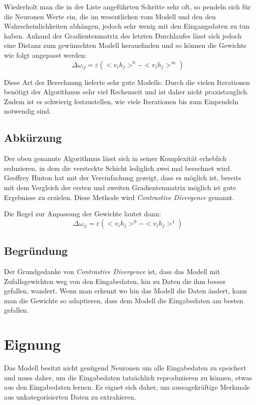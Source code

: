 Wiederholt man die in der Liste angeführten Schritte sehr oft, so pendeln sich für die Neuronen Werte ein, die im wesentlichen vom Modell und den den Wahrscheinlichkeiten abhängen, jedoch sehr wenig mit den Eingangsdaten zu tun haben. Anhand der Gradientenmatrix des letzten Durchlaufes lässt sich jedoch eine Distanz zum gewünschten Modell herausfinden und so können die Gewichte wie folgt angepasst werden:
$$\Delta\omega_{ij} = \varepsilon (<v_ih_j>^0 -  <v_ih_j>^\infty)$$

Diese Art der Berechnung lieferte sehr gute Modelle. Durch die vielen Iterationen benötigt der Algorithmus sehr viel Rechenzeit und ist daher nicht praxistauglich. Zudem ist es schwierig festzustellen, wie viele Iterationen bis zum Einpendeln notwendig sind.

\subsection{Abkürzung}

Der oben genannte Algorithmus lässt sich in seiner Komplexität erheblich reduzieren, in dem die versteckte Schicht lediglich zwei mal berechnet wird. Geoffrey Hinton hat mit der Vereinfachung gezeigt, dass es möglich ist, bereits mit dem Vergleich der ersten und zweiten Gradientenmatrix möglich ist gute Ergebnisse zu erzielen. Diese Methode wird \emph{Contrastive Divergence} genannt.

Die Regel zur Anpassung der Gewichte lautet dann:
$$\Delta\omega_{ij} = \varepsilon (<v_ih_j>^0 -  <v_ih_j>^1)$$

\subsection{Begründung}

Der Grundgedanke von \emph{Contrastive Divergence} ist, dass das Modell mit Zufallsgewichten weg von den Eingabedaten, hin zu Daten die ihm besser gefallen, wandert. Wenn man erkennt wo hin das Modell die Daten ändert, kann man die Gewichte so adaptieren, dass dem Modell die Eingabedaten am besten gefallen.

\section{Eignung}

Das Modell besitzt nicht genügend Neuronen um alle Eingabedaten zu speichert und muss daher, um die Eingabedaten tatsächlich reproduzieren zu können, etwas aus den Eingabedaten lernen. Es eignet sich daher, um aussagekräftige Merkmale aus unkategorisierten Daten zu extrahieren.

